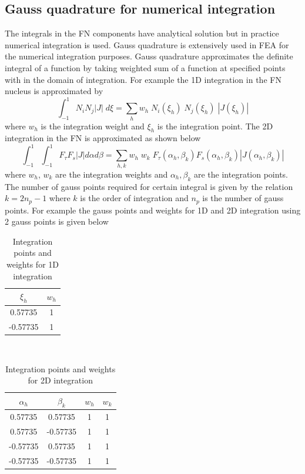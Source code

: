 \documentclass[a4paper,12pt]{article}
\begin{document}
\subsection*{Gauss quadrature for numerical integration}
\indent\indent\indent\indent The integrals in the FN components have analytical solution but in practice numerical integration is used. Gauss quadrature is extensively used in FEA for the numerical integration purposes. Gauss quadrature approximates the definite integral of a function by taking weighted sum of a function at specified points with in the domain of integration. For example the 1D integration in the FN nucleus is approximated by $$\int_{-1}^{1} N_{i} N_{j}|J|\;d\xi = \sum_{h}^{} w_{h}\; N_{i}(\xi_{h})\; N_{j}(\xi_{h})\;|J(\xi_{h})|$$ where $w_{h}$ is the integration weight and $\xi_{h}$ is the integration point. The 2D integration in the FN is approximated as shown below $$\int_{-1}^{1}\int_{-1}^{1} F_{\tau}F_{s} |J| d\alpha d\beta = \sum_{h,k}^{} w_{h}\;w_{k}\;  F_{\tau}(\alpha_{h},\beta_{k})F_{s}(\alpha_{h},\beta_{k}) |J(\alpha_{h},\beta_{k})|$$ where $w_{h}$,   $w_{k}$ are the integration weights and $\alpha_{h},\beta_{k}$ are the integration points.
The number of gauss points required for certain integral is given by the relation $ k = 2n_{p} - 1$ where $k$ is the order of integration and $n_{p}$ is the number of gauss points. For example the gauss points and weights for 1D and 2D integration using 2 gauss points is given below 
\begin{table}[h!]
  \begin{center}
     \begin{tabular}{c|c} 
      \textbf{$\xi_{h}$} & \textbf{$w_{h}$}\\
      \hline
      0.57735 & 1 \\
      -0.57735& 1 \\
       
    \end{tabular}
    \caption{Integration points and weights for 1D integration}
    \label{tab:table2}
  \end{center}
\end{table}\\
\begin{table}[h!]
  \begin{center}
     \begin{tabular}{c|c|c|c} 
      \textbf{$\alpha_{h}$} & \textbf{$\beta_{k}$} &     \textbf{$w_{h}$} & \textbf{$w_{k}$}\\
      \hline
      0.57735 & 0.57735 & 1 & 1\\
       0.57735 &-0.57735 &1 & 1\\
     -0.57735 & 0.57735 & 1 & 1\\
     -0.57735 &-0.57735 &1 & 1\\
    \end{tabular}
    \caption{Integration points and weights for 2D integration}
    \label{tab:table3}
  \end{center}
\end{table}
\end{document}
